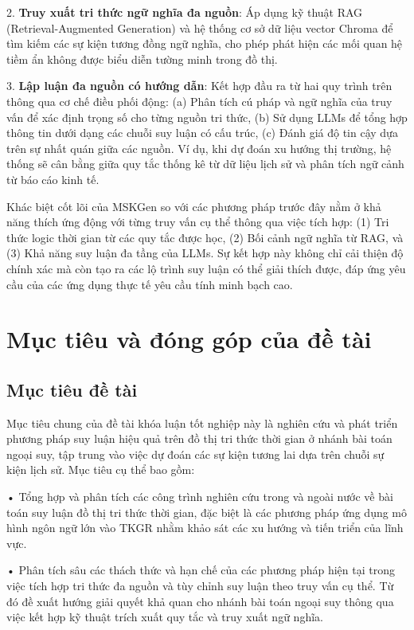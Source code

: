 2. \textbf{Truy xuất tri thức ngữ nghĩa đa nguồn}: Áp dụng kỹ thuật RAG (Retrieval-Augmented Generation) \cite{ref_article27} và hệ thống cơ sở dữ liệu vector Chroma \cite{ref_article17} để tìm kiếm các sự kiện tương đồng ngữ nghĩa, cho phép phát hiện các mối quan hệ tiềm ẩn không được biểu diễn tường minh trong đồ thị.

3. \textbf{Lập luận đa nguồn có hướng dẫn}: Kết hợp đầu ra từ hai quy trình trên thông qua cơ chế điều phối động: (a) Phân tích cú pháp và ngữ nghĩa của truy vấn để xác định trọng số cho từng nguồn tri thức, (b) Sử dụng LLMs để tổng hợp thông tin dưới dạng các chuỗi suy luận có cấu trúc, (c) Đánh giá độ tin cậy dựa trên sự nhất quán giữa các nguồn. Ví dụ, khi dự đoán xu hướng thị trường, hệ thống sẽ cân bằng giữa quy tắc thống kê từ dữ liệu lịch sử và phân tích ngữ cảnh từ báo cáo kinh tế.

Khác biệt cốt lõi của MSKGen so với các phương pháp trước đây nằm ở khả năng thích ứng động với từng truy vấn cụ thể thông qua việc tích hợp: (1) Tri thức logic thời gian từ các quy tắc được học, (2) Bối cảnh ngữ nghĩa từ RAG, và (3) Khả năng suy luận đa tầng của LLMs. Sự kết hợp này không chỉ cải thiện độ chính xác mà còn tạo ra các lộ trình suy luận có thể giải thích được, đáp ứng yêu cầu của các ứng dụng thực tế yêu cầu tính minh bạch cao.

\section{Mục tiêu và đóng góp của đề tài}

\subsection{Mục tiêu đề tài}
Mục tiêu chung của đề tài khóa luận tốt nghiệp này là nghiên cứu và phát triển phương pháp suy luận hiệu quả trên đồ thị tri thức thời gian ở nhánh bài toán ngoại suy, tập trung vào việc dự đoán các sự kiện tương lai dựa trên chuỗi sự kiện lịch sử. Mục tiêu cụ thể bao gồm:

• Tổng hợp và phân tích các công trình nghiên cứu trong và ngoài nước về bài toán suy luận đồ thị tri thức thời gian, đặc biệt là các phương pháp ứng dụng mô hình ngôn ngữ lớn vào TKGR nhằm khảo sát các xu hướng và tiến triển của lĩnh vực.

• Phân tích sâu các thách thức và hạn chế của các phương pháp hiện tại trong việc tích hợp tri thức đa nguồn và tùy chỉnh suy luận theo truy vấn cụ thể. Từ đó đề xuất hướng giải quyết khả quan cho nhánh bài toán ngoại suy thông qua việc kết hợp kỹ thuật trích xuất quy tắc và truy xuất ngữ nghĩa.

